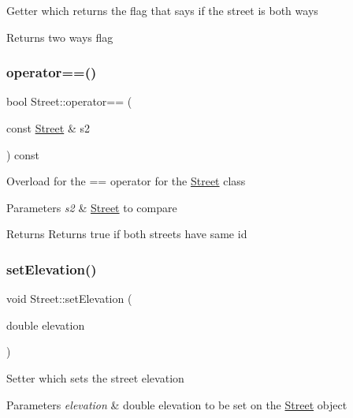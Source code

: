 Getter which returns the flag that says if the street is both ways \begin{DoxyReturn}{Returns}
two ways flag 
\end{DoxyReturn}
\mbox{\label{class_street_af902ded011ecdcec196873016bfe310e}} 
\subsubsection{\texorpdfstring{operator==()}{operator==()}}
{\footnotesize\ttfamily bool Street\+::operator== (\begin{DoxyParamCaption}\item[{const \mbox{\hyperlink{class_street}{Street}} \&}]{s2 }\end{DoxyParamCaption}) const}

Overload for the \textquotesingle{}==\textquotesingle{} operator for the \mbox{\hyperlink{class_street}{Street}} class 
\begin{DoxyParams}{Parameters}
{\em s2} & \mbox{\hyperlink{class_street}{Street}} to compare \\
\hline
\end{DoxyParams}
\begin{DoxyReturn}{Returns}
Returns true if both streets have same id 
\end{DoxyReturn}
\mbox{\label{class_street_a17e7f3ac9efd4a137e2611ae945c4c03}} 
\subsubsection{\texorpdfstring{set\+Elevation()}{setElevation()}}
{\footnotesize\ttfamily void Street\+::set\+Elevation (\begin{DoxyParamCaption}\item[{double}]{elevation }\end{DoxyParamCaption})}

Setter which sets the street elevation 
\begin{DoxyParams}{Parameters}
{\em elevation} & double elevation to be set on the \mbox{\hyperlink{class_street}{Street}} object \\
\hline
\end{DoxyParams}
\mbox{\label{class_street_a6539789494cff71ffab2913bbb84f7cf}} 
